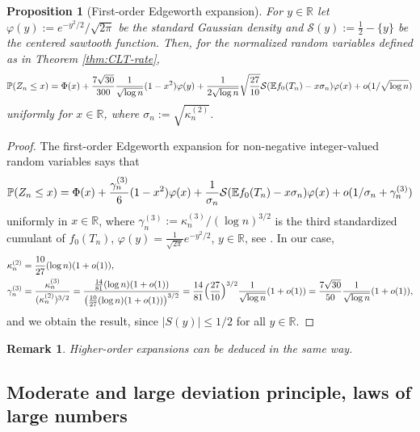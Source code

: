 \documentclass[11pt,a4paper]{article}
\numberwithin{equation}{section}
\newtheorem {proposition}[theorem]{Proposition}
\newtheorem {remark}[theorem]{Remark}
\def\EE{\mathbb{E}}
\def\PP{\mathbb{P}}
\def\RR{\mathbb{R}}
\begin{document}
\begin{proposition}[First-order Edgeworth expansion]
For $y\in\RR$ let $\varphi(y):=e^{-y^2/2}/\sqrt{2\pi}$ be the standard Gaussian density and $\mathcal{S}(y):=\tfrac{1}{2}-\{y\}$ be the centered sawtooth function.
Then, for the normalized random variables defined as in Theorem \ref{thm:CLT-rate},
$$
\PP(Z_n\leq x) = \Phi(x) + {7\sqrt{30}\over 300}{1\over\sqrt{\log n}}(1-x^2)\varphi(y)+{1\over 2\sqrt{\log n}}\sqrt{27\over 10}\mathcal{S}(\EE f_0(T_n)-x\sigma_n)\varphi(x)+o(1/\sqrt{\log n})
$$
uniformly for $x\in\RR$, where $\sigma_n:=\sqrt{\kappa_n^{(2)}}$.
\end{proposition}
\begin{proof}
The first-order Edgeworth expansion for non-negative integer-valued random variables says that
$$
\PP(Z_n\leq x) = \Phi(x) + \frac{\gamma_n^{(3)}}{6}(1-x^2)\varphi(x) + {1\over\sigma_n}\mathcal{S}(\EE f_0(T_n)-x\sigma_n)\varphi(x) + o(1/\sigma_n + \gamma_n^{(3)})
$$
uniformly in $x\in\RR$, where $\gamma_n^{(3)}:=\kappa_n^{(3)}/(\log n)^{3/2}$ is the third standardized cumulant of $f_0(T_n)$, $\varphi(y)=\tfrac{1}{\sqrt{2\pi}}e^{-y^2/2}$, $y\in\RR$, see \cite[Chapter 23]{BhattRao}. In our case, 
\begin{align*}
    \kappa_n^{(2)} &= \frac{10}{27}(\log n)(1+o(1)),\\
    \gamma_n^{(3)} &= {\kappa_n^{(3)}\over(\kappa_n^{(2)})^{3/2}} = {{14\over 81}(\log n)(1+o(1))\over\big({10\over 27}(\log n)(1+o(1))\big)^{3/2}} = {14\over 81}\Big({27\over 10}\Big)^{3/2} {1\over\sqrt{\log n}}(1+o(1))= {7\sqrt{30}\over 50}{1\over\sqrt{\log n}}(1+o(1)),
\end{align*}
and we obtain the result, since $|S(y)|\leq 1/2$ for all $y\in\RR$.
\end{proof}


\begin{remark}
    Higher-order expansions can be deduced in the same way.
\end{remark}

\subsection{Moderate and large deviation principle, laws of large numbers}\label{sec:MDPandLDP}
\end{document}
